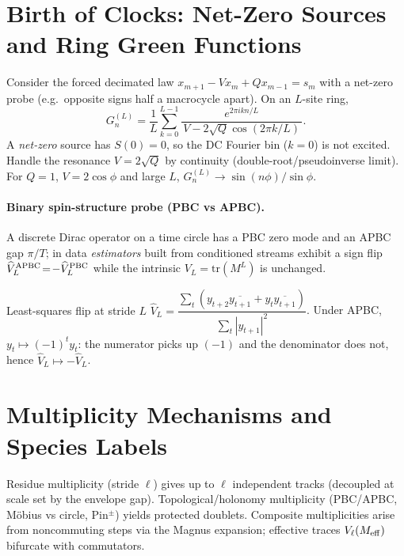 \documentclass[11pt]{article}
\begin{document}
\section{Birth of Clocks: Net-Zero Sources and Ring Green Functions}
Consider the forced decimated law $x_{m+1}-Vx_m+Qx_{m-1}=s_m$ with a net-zero probe (e.g.\ opposite signs half a macrocycle apart). 
On an $L$-site ring,
\[
G^{(L)}_n=\frac{1}{L}\sum_{k=0}^{L-1}
\frac{e^{2\pi i k n/L}}{\,V-2\sqrt{Q}\cos(2\pi k/L)\,}.
\]
A \emph{net-zero} source has $S(0)=0$, so the DC Fourier bin ($k=0$) is not excited.
Handle the resonance $V=2\sqrt Q$ by continuity (double-root/pseudoinverse limit).
For $Q=1$, $V=2\cos\phi$ and large $L$, $G^{(L)}_n\to \sin(n\phi)/\sin\phi$.

\paragraph{Binary spin-structure probe (PBC vs APBC).}
A discrete Dirac operator on a time circle has a PBC zero mode and an APBC gap $\pi/T$; in data \emph{estimators} built from conditioned streams exhibit a sign flip $\widehat V_L^{\rm APBC}\!=\!-\widehat V_L^{\rm PBC}$ while the intrinsic $V_L=\mathrm{tr}(M^L)$ is unchanged. 

\begin{proofbox}{Least-squares flip at stride $L$}
\(\widehat V_L=\dfrac{\sum_t (y_{t+2}\overline{y_{t+1}}+y_t\overline{y_{t+1}})}
{\sum_t |y_{t+1}|^2}\).
Under APBC, \(y_t\mapsto (-1)^t y_t\): the numerator picks up \((-1)\) and the
denominator does not, hence \(\widehat V_L\mapsto -\widehat V_L\).
\end{proofbox}


\section{Multiplicity Mechanisms and Species Labels}
Residue multiplicity (stride $\ell$) gives up to $\ell$ independent tracks (decoupled at scale set by the envelope gap).
Topological/holonomy multiplicity (PBC/APBC, Möbius vs circle, Pin$^\pm$) yields protected doublets.
Composite multiplicities arise from noncommuting steps via the Magnus expansion; effective traces $V_\ell(M_{\rm eff})$ bifurcate with commutators.
\end{document}
